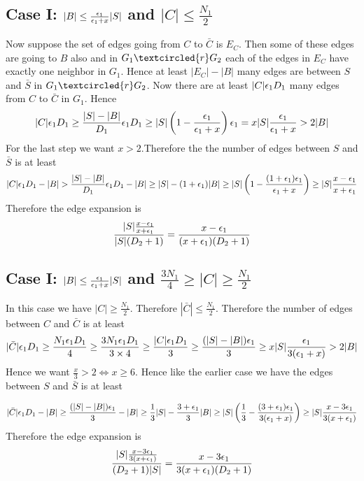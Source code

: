 \documentclass[a4paper, 11pt]{article}
\begin{document}
{\begin{enumerate}
	\subsection*{Case I: $|B|\leq\frac{\epsilon_1}{\epsilon_1+x}|S|$ and $|C|\leq \frac{N_1}{2}$}
	Now suppose the set of edges going from $C$ to $\bar{C}$ is $E_C$. Then some of these edges are going to $B$ also and in $G_1\textcircled{r}G_2$ each of the edges in $E_C$ have exactly one neighbor in $G_1$. Hence at least $|E_C|-|B|$ many edges are between $S$ and $\bar{S}$ in $G_1\textcircled{r}G_2$. Now there are at least $|C|\epsilon_1 D_1$ many edges from $C$ to $\bar{C}$ in $G_1$. Hence $$|C|\epsilon_1 D_1\geq \frac{|S|-|B|}{D_1}\epsilon _1D_1\geq |S|\left( 1-\frac{\epsilon_1}{\epsilon_1+x} \right)\epsilon_1=x|S|\frac{\epsilon_1}{\epsilon_1+x}> 2|B|$$For the last step we want $\boxed{x>2}$.Therefore the the number of edges between $S$ and $\bar{S}$ is at least $$|C|\eps_1 D_1-|B|>\frac{|S|-|B|}{D_1}\eps_1D_1-|B|\geq |S|-(1+\eps_1)|B|\geq |S|\lt(1- \frac{(1+\eps_1)\eps_1}{\eps_1+x}  \rt)\geq |S|\frac{x-\eps_1}{x+\eps_1}$$Therefore the edge expansion is $$\frac{|S|\frac{x-\epsilon_1}{x+\epsilon_1}}{|S|(D_2+1)}=\frac{x-\epsilon_1}{(x+\epsilon_1)(D_2+1)}$$	
	\subsection*{Case I: $|B|\leq\frac{\epsilon_1}{\epsilon_1+x}|S|$  and $\frac{3N_1}{4}\geq |C|\geq \frac{N_1}{2}$}
	In this case we have $|C|\geq \frac{N_1}{2}$. Therefore $|\bar{C}|\leq \frac{N_1}{2}$. Therefore the number of edges between $C$ and $\bar{C}$ is at least $$|\bar{C}|\epsilon_1D_1\geq \frac{N_1\epsilon_1 D_1}{4}\geq \frac{3N_1\epsilon_1D_1}{3\times 4}\geq \frac{|C|\epsilon_1D_1}{3}\geq \frac{(|S|-|B|)\epsilon_1}{3}\geq x|S|\frac{\epsilon_1}{3(\epsilon_1+x)}>2|B|$$Hence we want $\frac{x}{3}>2\iff \boxed{x\geq 6}$. Hence like the earlier case we have the edges between $S$ and $\bar{S}$ is at least 
	
	$$|\bar{C}|\epsilon_1D_1-|B|\geq \frac{(|S|-|B|)\epsilon_1}{3}-|B|\geq \frac13|S|-\frac{3+\epsilon_1}3|B|\geq |S|\left(\frac13- \frac{(3+\epsilon_1)\epsilon_1}{3(\epsilon_1+x)}  \right)\geq |S|\frac{x-3\epsilon_1}{3(x+\epsilon_1)}$$Therefore the edge expansion is $$\frac{|S|\frac{x-3\epsilon_1}{3(x+\epsilon_1)}}{(D_2+1)|S|}=\frac{x-3\epsilon_1}{3(x+\epsilon_1)(D_2+1)}$$
	


\end{enumerate}}
\end{document}
